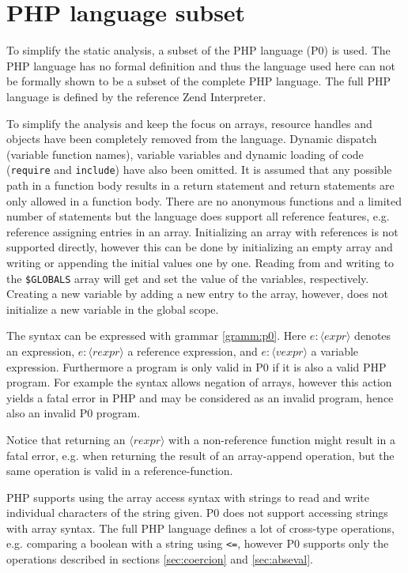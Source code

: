 \section{PHP language subset}
\newcommand{\syn}[1]{\langle\mathit{#1}\rangle}
\label{sec:langsubset}
To simplify the static analysis, a subset of the PHP language (P0) is used. The PHP language has no formal definition and thus the language used here can not be formally shown to be a subset of the complete PHP language. The full PHP language is defined by the reference Zend Interpreter.

To simplify the analysis and keep the focus on arrays, resource handles and objects have been completely removed from the language. Dynamic dispatch (variable function names), variable variables and dynamic loading of code (\texttt{require} and \texttt{include}) have also been omitted. It is assumed that any possible path in a function body results in a return statement and return statements are only allowed in a function body. There are no anonymous functions and a limited number of statements but the language does support all reference features, e.g. reference assigning entries in an array. Initializing an array with references is not supported directly, however this can be done by initializing an empty array and writing or appending the initial values one by one. Reading from and writing to the \texttt{\$GLOBALS} array will get and set the value of the variables, respectively. Creating a new variable by adding a new entry to the array, however, does not initialize a new variable in the global scope.

The syntax can be expressed with grammar \ref{gramm:p0}. Here $e : \syn{expr}$ denotes an expression, $e : \syn{rexpr}$ a reference expression, and $e : \syn{vexpr}$ a variable expression.   Furthermore a program is only valid in P0 if it is also a valid PHP program. For example the syntax allows negation of arrays, however this action yields a fatal error in PHP and may be considered as an invalid program, hence also an invalid P0 program. 

Notice that returning an $\syn{rexpr}$ with a non-reference function might result in a fatal error, e.g. when returning the result of an array-append operation, but the same operation is valid in a reference-function.

PHP supports using the array access syntax with strings to read and write individual characters of the string given. P0 does not support accessing strings with array syntax. The full PHP language defines a lot of cross-type operations, e.g. comparing a boolean with a string using \texttt{<=}, however P0 supports only the operations described in sections \ref{sec:coercion} and \ref{sec:abseval}.

